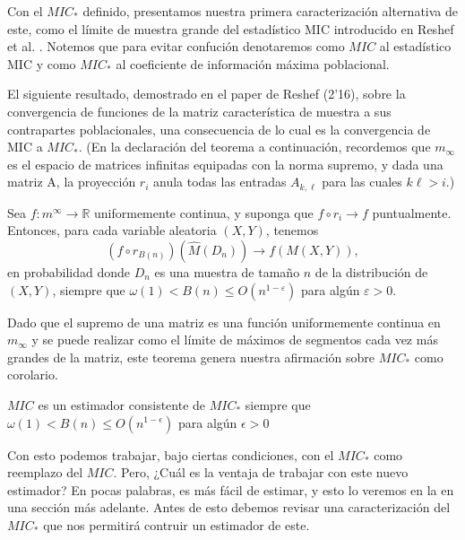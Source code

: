         Con el $MIC_*$ definido, presentamos nuestra primera caracterizaci\'on alternativa de este, como el l\'imite de muestra grande del estad\'istico MIC introducido en Reshef et al. \cite{Reshef2011}. Notemos que para evitar confuci\'on denotaremos como $MIC$ al estad\'istico MIC y como $MIC_*$ al coeficiente de informaci\'on m\'axima poblacional.
    
        El siguiente resultado, demostrado en el paper de Reshef (2'16)\cite{Reshef2016}, sobre la convergencia de funciones de la matriz caracter\'istica de muestra a sus contrapartes poblacionales, una consecuencia de lo cual es la convergencia de MIC a $MIC_*$. (En la declaraci\'on del teorema a continuaci\'on, recordemos que $m_\infty$ es el espacio de matrices infinitas equipadas con la norma supremo, y dada una matriz A, la proyecci\'on $r_i$ anula todas las entradas $A_{k, \ell}$ para las cuales $k\ell > i.$)
    
        \begin{thm}
            Sea $f: m^{\infty} \rightarrow \mathbb{R}$ uniformemente continua, y suponga que $f \circ r_i \rightarrow f$ puntualmente. Entonces, para cada variable aleatoria $(X, Y)$, tenemos
            $$
            \left(f \circ r_{B(n)}\right)\left(\widehat{M}\left(D_n\right)\right) \rightarrow f(M(X, Y)),
            $$
            en probabilidad donde $D_n$ es una muestra de tama\~no $n$ de la distribuci\'on de $(X, Y)$, siempre que $\omega(1)<B(n) \leq O\left(n^{1-\varepsilon}\right)$ para alg\'un $\varepsilon>0$.
        \end{thm}
    
        Dado que el supremo de una matriz es una funci\'on uniformemente continua en $m_\infty$ y se puede realizar como el l\'imite de m\'aximos de segmentos cada vez m\'as grandes de la matriz, este teorema genera nuestra afirmaci\'on sobre $MIC_*$ como corolario.
    
        \begin{cor}
            $MIC$ es un estimador consistente de $MIC_*$ siempre que $\omega(1) < B(n) \leq O(n^{1-\epsilon})$ para alg\'un $\epsilon > 0$
        \end{cor}
    
        Con esto podemos trabajar, bajo ciertas condiciones, con el $MIC_*$ como reemplazo del $MIC$. Pero, ¿Cu\'al es la ventaja de trabajar con este nuevo estimador? En pocas palabras, es m\'as f\'acil de estimar, y esto lo veremos en la en una secci\'on m\'as adelante. Antes de esto debemos revisar una caracterizaci\'on del $MIC_*$ que nos permitir\'a contruir un estimador de este.
    
